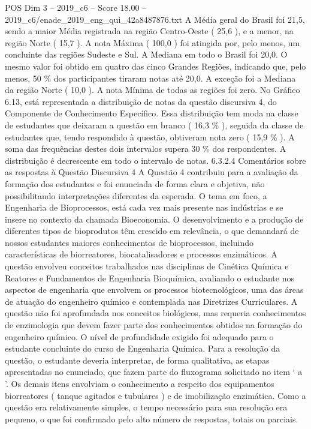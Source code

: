 \begin{textsample}{POS Dim 3 – 2019\_c6 – Score 18.00 – 2019\_c6/enade\_2019\_eng\_qui\_42a8487876.txt}
A Média geral do Brasil foi 21,5, sendo a maior Média registrada na região Centro-Oeste ( 25,6 ), e a menor, na região Norte ( 15,7 ).
A nota Máxima ( 100,0 ) foi atingida por, pelo menos, um concluinte das regiões Sudeste e Sul.
A Mediana em todo o Brasil foi 20,0.
O mesmo valor foi obtido em quatro das cinco Grandes Regiões, indicando que, pelo menos, 50 \% dos participantes tiraram notas até 20,0.
A exceção foi a Mediana da região Norte ( 10,0 ).
A nota Mínima de todas as regiões foi zero.
No Gráfico 6.13, está representada a distribuição de notas da questão discursiva 4, do Componente de Conhecimento Específico.
Essa distribuição tem moda na classe de estudantes que deixaram a questão em branco ( 16,3 \% ), seguida da classe de estudantes que, tendo respondido à questão, obtiveram nota zero ( 15,9 \% ).
A soma das frequências destes dois intervalos supera 30 \% dos respondentes.
A distribuição é decrescente em todo o intervalo de notas. 6.3.2.4 Comentários sobre as respostas à Questão Discursiva 4 A Questão 4 contribuiu para a avaliação da formação dos estudantes e foi enunciada de forma clara e objetiva, não possibilitando interpretações diferentes da esperada.
O tema em foco, a Engenharia de Bioprocessos, está cada vez mais presente nas indústrias e se insere no contexto da chamada Bioeconomia.
O desenvolvimento e a produção de diferentes tipos de bioprodutos têm crescido em relevância, o que demandará de nossos estudantes maiores conhecimentos de bioprocessos, incluindo características de biorreatores, biocatalisadores e processos enzimáticos.
A questão envolveu conceitos trabalhados nas disciplinas de Cinética Química e Reatores e Fundamentos de Engenharia Bioquímica, avaliando o estudante nos aspectos de engenharia que envolvem os processos biotecnológicos, uma das áreas de atuação do engenheiro químico e contemplada nas Diretrizes Curriculares.
A questão não foi aprofundada nos conceitos biológicos, mas requeria conhecimentos de enzimologia que devem fazer parte dos conhecimentos obtidos na formação do engenheiro químico.
O nível de profundidade exigido foi adequado para o estudante concluinte do curso de Engenharia Química.
Para a resolução da questão, o estudante deveria interpretar, de forma qualitativa, as etapas apresentadas no enunciado, que fazem parte do fluxograma solicitado no item ‘ a ’.
Os demais itens envolviam o conhecimento a respeito dos equipamentos biorreatores ( tanque agitados e tubulares ) e de imobilização enzimática.
Como a questão era relativamente simples, o tempo necessário para sua resolução era pequeno, o que foi confirmado pelo alto número de respostas, totais ou parciais.

\end{textsample}
